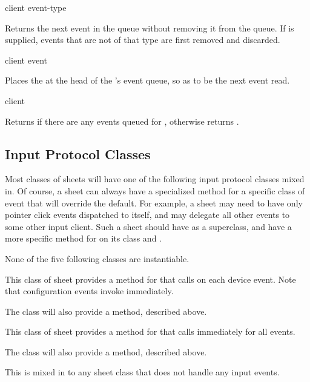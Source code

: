  {client \optional event-type}

Returns the next event in the queue without removing it from the queue.  If
 is supplied, events that are not of that type are first
removed and discarded.

 {client event}

Places the  at the head of the 's event queue, so as to
be the next event read.

 {client}

Returns  if there are any events queued for , otherwise
returns .


\subsection {Input Protocol Classes}

Most classes of sheets will have one of the following input protocol classes
mixed in.  Of course, a sheet can always have a specialized method for a
specific class of event that will override the default.  For example, a sheet
may need to have only pointer click events dispatched to itself, and may
delegate all other events to some other input client.  Such a sheet should have
 as a superclass, and have a more specific method
for  on its class and .

None of the five following classes are instantiable.


This class of sheet provides a method for  that calls
 on each device event.  Note that configuration events invoke
 immediately.

The  class will also provide a
 method, described above.


This class of sheet provides a method for  that calls
 immediately for all events.

The  class will also provide a
 method, described above.


This is mixed in to any sheet class that does not handle any input events.

